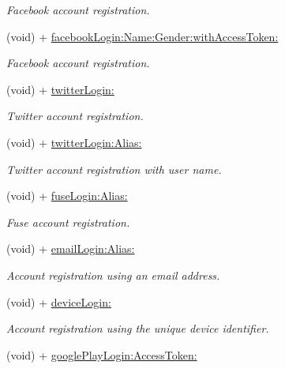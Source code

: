 \begin{DoxyCompactItemize}
\begin{DoxyCompactList}\small\item\em Facebook account registration. \end{DoxyCompactList}\item 
(void) + \hyperlink{interface_fuse_s_d_k_a38487be821059910b1b939d818cd0e9f}{facebook\+Login\+:\+Name\+:\+Gender\+:with\+Access\+Token\+:}
\begin{DoxyCompactList}\small\item\em Facebook account registration. \end{DoxyCompactList}\item 
(void) + \hyperlink{interface_fuse_s_d_k_add5138c113d6e4c1201f70bf8b84eb02}{twitter\+Login\+:}
\begin{DoxyCompactList}\small\item\em Twitter account registration. \end{DoxyCompactList}\item 
(void) + \hyperlink{interface_fuse_s_d_k_a48950b5880ce336cc601a752bcda1a3a}{twitter\+Login\+:\+Alias\+:}
\begin{DoxyCompactList}\small\item\em Twitter account registration with user name. \end{DoxyCompactList}\item 
(void) + \hyperlink{interface_fuse_s_d_k_af7b69ec93b7a26b8512d730db9383511}{fuse\+Login\+:\+Alias\+:}
\begin{DoxyCompactList}\small\item\em Fuse account registration. \end{DoxyCompactList}\item 
(void) + \hyperlink{interface_fuse_s_d_k_a6b16a24e8cb2fdd04b8be9e501259135}{email\+Login\+:\+Alias\+:}
\begin{DoxyCompactList}\small\item\em Account registration using an email address. \end{DoxyCompactList}\item 
(void) + \hyperlink{interface_fuse_s_d_k_ae3a27f858739fee7ad6483a909206943}{device\+Login\+:}
\begin{DoxyCompactList}\small\item\em Account registration using the unique device identifier. \end{DoxyCompactList}\item 
(void) + \hyperlink{interface_fuse_s_d_k_a826545aa45a550cbc10cc98137ee5898}{google\+Play\+Login\+:\+Access\+Token\+:}

\end{DoxyCompactItemize}
